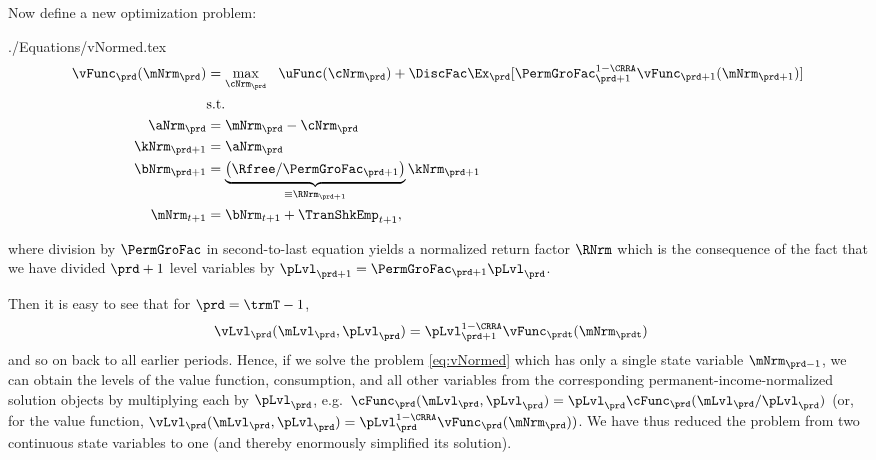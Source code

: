 \documentclass[\econtexRoot/SolvingMicroDSOPs]{subfiles}
\begin{document}
Now define a new optimization problem:
\begin{verbatimwrite}{./Equations/vNormed.tex}
  \begin{equation}\begin{gathered}\begin{aligned}
        \vFunc_{\prd}(\mNrm_{\prd}) & = \max_{{\cNrm}_{\prd}} ~~ \uFunc(\cNrm_{\prd})+{\DiscFac}\Ex_{\prd}[ \PermGroFac_{\prd+1}^{1-\CRRA}\vFunc_{\prd+1}(\mNrm_{\prd+1})] \label{eq:vNormed}                   \\
                                         & \text{s.t.}                                                                                 \\
        \aNrm_{\prd}                       & = \mNrm_{\prd}-\cNrm_{\prd}                                                                     \\
        {\kNrm}_{\prd+1}                     & = \aNrm_{\prd}                                                                                \\
        \bNrm_{\prd+1}                     & = \underbrace{\left(\Rfree/\PermGroFac_{\prd+1}\right)}_{\equiv \RNrm_{\prd+1}}{\kNrm}_{\prd+1} \\
        \mNrm_{t+1}                        & = \bNrm_{t+1}+\TranShkEmp_{t+1},
      \end{aligned}\end{gathered}\end{equation}
\end{verbatimwrite}
\unskip
where division by $\PermGroFac$ in second-to-last equation yields a normalized return factor $\RNrm$ which is the consequence of the fact that we have divided $\prd+1$ level variables by $\pLvl_{\prd+1}=\PermGroFac_{\prd+1}\pLvl_{\prd}$.

Then it is easy to see that for $\prd=\trmT-1$, 
\begin{equation*}\begin{gathered}\begin{aligned}
      \vLvl_{\prd}(\mLvl_{\prd},\pLvl_{\prd}) & =  \pLvl_{\prd+1}^{1-\CRRA}\vFunc_{\prdt}(\mNrm_{\prdt})
    \end{aligned}\end{gathered}\end{equation*}
and so on back to all earlier periods.  Hence, if we solve the problem \eqref{eq:vNormed} which has only a single state variable $\mNrm_{\prd-1}$, we can obtain the levels of the value function, consumption, and all other variables from the corresponding permanent-income-normalized solution objects by multiplying each by $\pLvl_{\prd}$, e.g.\ $\cFunc_{\prd}(\mLvl_{\prd},\pLvl_{\prd})=\pLvl_{\prd}\cFunc_{\prd}(\mLvl_{\prd}/\pLvl_{\prd})$ (or, for the value function, $\vLvl _{\prd}(\mLvl_{\prd},\pLvl_{\prd}) = \pLvl_{\prd}^{1-\CRRA}\vFunc_{\prd}(\mNrm_{\prd}))$.  We have thus reduced the problem from two continuous state variables to one (and thereby enormously simplified its solution).
\end{document}
